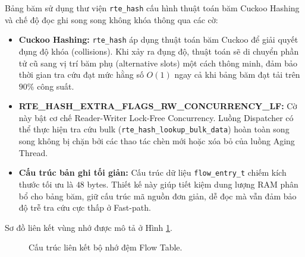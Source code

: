 \documentclass[12pt,a4paper,twoside]{report}
\begin{document}
Bảng băm sử dụng thư viện \texttt{rte\_hash} cấu hình thuật toán băm Cuckoo Hashing và chế độ đọc ghi song song không khóa thông qua các cờ:
\begin{itemize}
    \item \textbf{Cuckoo Hashing:} \texttt{rte\_hash} áp dụng thuật toán băm Cuckoo để giải quyết đụng độ khóa (collisions). Khi xảy ra đụng độ, thuật toán sẽ di chuyển phần tử cũ sang vị trí băm phụ (alternative slots) một cách thông minh, đảm bảo thời gian tra cứu đạt mức hằng số $O(1)$ ngay cả khi bảng băm đạt tải trên $90\%$ công suất.
    \item \textbf{RTE\_HASH\_EXTRA\_FLAGS\_RW\_CONCURRENCY\_LF:} \newline Cờ này bật cơ chế Reader-Writer Lock-Free Concurrency. Luồng Dispatcher có thể thực hiện tra cứu bulk (\texttt{rte\_hash\_lookup\_bulk\_data}) hoàn toàn song song không bị chặn bởi các thao tác chèn mới hoặc xóa bỏ của luồng Aging Thread.
    \item \textbf{Cấu trúc bản ghi tối giản:} Cấu trúc dữ liệu \texttt{flow\_entry\_t} chiếm kích thước tối ưu là $48$ bytes. Thiết kế này giúp tiết kiệm dung lượng RAM phân bổ cho bảng băm, giữ cấu trúc mã nguồn đơn giản, dễ đọc mà vẫn đảm bảo độ trễ tra cứu cực thấp ở Fast-path.
\end{itemize}
Sơ đồ liên kết vùng nhớ được mô tả ở Hình \ref{fig:flowtable_memory}.

\begin{figure}[htbp]
    \centering
    \caption{Cấu trúc liên kết bộ nhớ đệm Flow Table.}
    \label{fig:flowtable_memory}
\end{figure}
\end{document}
